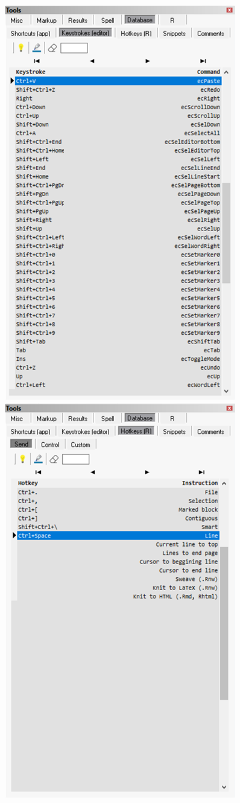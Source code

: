 \begin{figure}[H]
  \includegraphics[scale=0.35]{./res/tools_database_keystrokes.png}~~
  \includegraphics[scale=0.35]{./res/tools_database_rh_send.png}~~

\end{figure}
